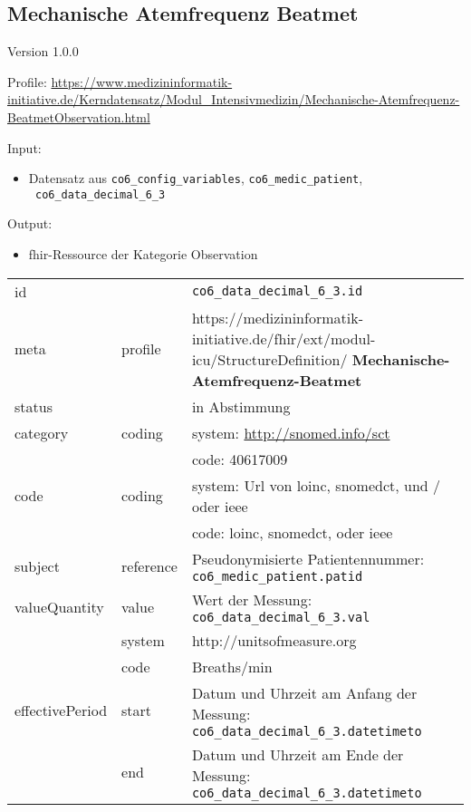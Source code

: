 \subsection{Mechanische Atemfrequenz Beatmet} 
\noindent Version 1.0.0

\noindent Profile: \url{https://www.medizininformatik-initiative.de/Kerndatensatz/Modul_Intensivmedizin/Mechanische-Atemfrequenz-BeatmetObservation.html}

\noindent Input:

\begin{itemize}
	\item Datensatz aus \texttt{co6\_config\_variables}, \texttt{co6\_medic\_patient}, \\ \texttt{
co6\_data\_decimal\_6\_3}
\end{itemize}
Output:
\begin{itemize}
        \item \ac{fhir}-Ressource der Kategorie \glqq Observation\grqq{}
\end{itemize}
\begin{longtable}{|l|l|p{7.5cm}|}
        \hline
        \rowcolor{lightgray} \multicolumn{3}{|l|}{Data Mapping (inhaltlich)} \\ \hline
        id &  & \texttt{co6\_data\_decimal\_6\_3.id} \\ \hline
	meta & profile & https://medizininformatik-initiative.de/fhir/ext/modul-icu/StructureDefinition/\textbf{
Mechanische-Atemfrequenz-Beatmet} \\ \hline 
	status &  & in Abstimmung  \\ \hline 
	category & coding & system: \url{http://snomed.info/sct} \\
\cline{3-3}
	& & code: 40617009 \\ \hline
	code & coding & system: Url von \ac{loinc}, \ac{snomedct}, und / oder \ac{ieee} \\ 
	\cline{3-3} 
	 &  & code: \ac{loinc}, \ac{snomedct}, oder \ac{ieee} \\ \hline
	subject & reference & Pseudonymisierte Patientennummer: \texttt{co6\_medic\_patient.patid} \\ \hline
	valueQuantity & value & Wert der Messung: \texttt{
co6\_data\_decimal\_6\_3.val} \\
        \cline{2-3}
         & system & http://unitsofmeasure.org \\
         \cline{2-3}
         & code & {Breaths}/min \\ \hline
    effectivePeriod & start & Datum und Uhrzeit am Anfang der Messung: \texttt{
co6\_data\_decimal\_6\_3.datetimeto} \\
    \cline{2-3}
     & end & Datum und Uhrzeit am Ende der Messung: \texttt{
co6\_data\_decimal\_6\_3.datetimeto} \\ \hline
\end{longtable}


